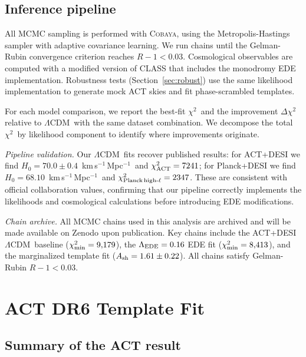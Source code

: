 \documentclass[twocolumn,showpacs,preprintnumbers,amsmath,amssymb,prd]{revtex4-2}
\newcommand{\lcdm}{$\Lambda$CDM}
\newcommand{\chisq}{$\chi^2$}
\newcommand{\kms}{km\,s$^{-1}$\,Mpc$^{-1}$}
\begin{document}
\subsection{Inference pipeline}

All MCMC sampling is performed with \textsc{Cobaya}, using the Metropolis-Hastings 
sampler with adaptive covariance learning. We run chains until the Gelman-Rubin 
convergence criterion reaches $R - 1 < 0.03$. Cosmological observables are computed 
with a modified version of \textsc{CLASS} that includes the monodromy EDE implementation. 
Robustness tests (Section~\ref{sec:robust}) use the same likelihood implementation 
to generate mock ACT skies and fit phase-scrambled templates.

For each model comparison, we report the best-fit \chisq\ and the improvement 
$\Delta\chi^2$ relative to \lcdm\ with the same dataset combination. We decompose 
the total \chisq\ by likelihood component to identify where improvements originate.

\emph{Pipeline validation.} Our \lcdm\ fits recover published results: for 
ACT+DESI we find $H_0 = 70.0 \pm 0.4$~\kms\ and $\chi^2_{\rm ACT} = 7241$; for 
Planck+DESI we find $H_0 = 68.10$~\kms\ and $\chi^2_{\rm Planck\,high\text{-}\ell} 
= 2347$. These are consistent with official collaboration values, confirming 
that our pipeline correctly implements the likelihoods and cosmological 
calculations before introducing EDE modifications.

\emph{Chain archive.} All MCMC chains used in this analysis are archived and 
will be made available on Zenodo upon publication. Key chains include the 
ACT+DESI \lcdm\ baseline ($\chi^2_{\rm min} = 9{,}179$), the 
$\Lambda_{\rm EDE} = 0.16$ EDE fit ($\chi^2_{\rm min} = 8{,}413$), and 
the marginalized template fit ($A_{\rm sh} = 1.61 \pm 0.22$). All chains 
satisfy Gelman-Rubin $R - 1 < 0.03$.

\section{ACT DR6 Template Fit}
\label{sec:act}

\subsection{Summary of the ACT result}
\end{document}

